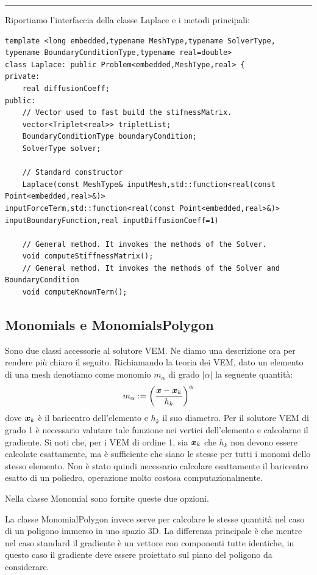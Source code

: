 \documentclass[oneside,12pt]{book}  %
\theoremstyle{plain}
\theoremstyle{definition}
\theoremstyle{remark}
\numberwithin{equation}{chapter} %
\begin{document}
\noindent\rule{14cm}{1pt}

Riportiamo l'interfaccia della classe Laplace e i metodi principali:

\begin{verbatim}
template <long embedded,typename MeshType,typename SolverType,
typename BoundaryConditionType,typename real=double>
class Laplace: public Problem<embedded,MeshType,real> {
private:
    real diffusionCoeff;	
public:
    // Vector used to fast build the stifnessMatrix.
    vector<Triplet<real>> tripletList; 
    BoundaryConditionType boundaryCondition;
    SolverType solver;

    // Standard constructor
    Laplace(const MeshType& inputMesh,std::function<real(const Point<embedded,real>&)> 
inputForceTerm,std::function<real(const Point<embedded,real>&)> 
inputBoundaryFunction,real inputDiffusionCoeff=1)

    // General method. It invokes the methods of the Solver.
    void computeStiffnessMatrix();
    // General method. It invokes the methods of the Solver and BoundaryCondition 
    void computeKnownTerm();

\end{verbatim}

\subsection{Monomials e MonomialsPolygon}
Sono due classi accessorie al solutore VEM. Ne diamo una descrizione
ora per rendere pi\`u chiaro il seguito. Richiamando la teoria dei
VEM, dato un elemento di una mesh
denotiamo come monomio
$m_\alpha$ di grado $|\alpha|$ la seguente quantit\`a: 
$$m_\alpha:=\bigg( \frac{{\mbox{\boldmath$x$}}-{\mbox{\boldmath$x$}}_k}{h_k} \bigg) ^\alpha$$
dove ${\mbox{\boldmath$x$}}_k$ \`e il baricentro dell'elemento e $h_k$ il suo diametro.
Per il solutore VEM di grado 1 \`e necessario valutare tale funzione
nei vertici dell'elemento e calcolarne il gradiente. Si noti che, per
i VEM di ordine 1, sia
${\mbox{\boldmath$x$}}_k$ che $h_k$ non devono essere calcolate esattamente, ma \`e
sufficiente che siano le stesse per tutti i monomi dello stesso
elemento. Non \`e stato quindi necessario calcolare esattamente il
baricentro esatto di un poliedro, operazione molto costosa
computazionalmente.

Nella classe Monomial sono fornite queste due opzioni.

La classe MonomialPolygon invece serve per calcolare le stesse
quantit\`a nel caso di un poligono immerso in uno spazio 3D.
La differenza principale \`e che mentre nel caso standard il gradiente
\`e un vettore con componenti tutte identiche, in questo caso il
gradiente deve essere proiettato sul piano del poligono da
considerare.
\end{document}
